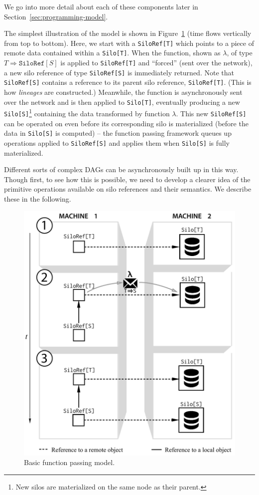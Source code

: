 \documentclass{jfp1}
\begin{document}
We go into more detail about each of these components later in Section~\ref{sec:programming-model}. 

The simplest illustration of the model is shown in
Figure~\ref{fig:basic-diagram} (time flows vertically from top to bottom). Here,
we start with a \verb|SiloRef[T]| which points to a piece of remote data
contained within a \verb|Silo[T]|. When the function, shown as $\lambda$, of
type $T \Rightarrow \texttt{SiloRef}[S]$ is applied to \verb|SiloRef[T]| and ``forced'' (sent over
the network), a new silo reference of type \verb|SiloRef[S]| is immediately
returned. Note that \verb|SiloRef[S]| contains a reference to its parent silo
reference, \verb|SiloRef[T]|. (This is how {\em lineages} are constructed.)
Meanwhile, the function is asynchronously sent over the network and is then applied
to \verb|Silo[T]|, eventually producing a new \verb|Silo[S]|\footnote{New silos are materialized on the same node as their parent.} containing the data
transformed by function $\lambda$. This new \verb|SiloRef[S]| can be operated on
even before its corresponding silo is materialized (\ie before the data in
\verb|Silo[S]| is computed) – the function passing framework queues up
operations applied to \verb|SiloRef[S]| and applies them when \verb|Silo[S]| is
fully materialized.

Different sorts of complex DAGs can be asynchronously built up in this way.
Though first, to see how this is possible, we need to develop a clearer idea of
the primitive operations available on silo references and their semantics. We
describe these in the following.

\begin{figure}[ht!]
\centering\includegraphics[width=0.8\columnwidth]{pic/basic-diagram.pdf}
\caption{Basic function passing model.}\label{fig:basic-diagram}
\end{figure}
\end{document}
